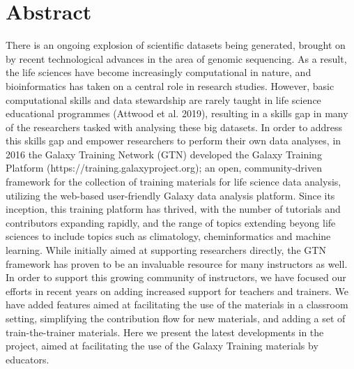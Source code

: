 \documentclass[10pt,letterpaper]{article}
\begin{document}
\section*{Abstract}
There is an ongoing explosion of scientific datasets being generated, brought on by recent technological advances in the area of genomic sequencing.
As a result, the life sciences have become increasingly computational in nature, and bioinformatics has taken on a central role in research studies.
However, basic computational skills and data stewardship are rarely taught in life science educational programmes (Attwood et al. 2019), resulting in a skills gap in many of the researchers tasked with analysing these big datasets.
In order to address this skills gap and empower researchers to perform their own data analyses, in 2016 the Galaxy Training Network (GTN) developed the Galaxy Training Platform (https://training.galaxyproject.org); an open, community-driven framework for the collection of training materials for life science data analysis, utilizing the web-based user-friendly Galaxy data analysis platform.
Since its inception, this training platform has thrived, with the number of tutorials and contributors expanding rapidly, and the range of topics extending beyong life sciences to include topics such as climatology, cheminformatics and machine learning.
While initially aimed at supporting researchers directly, the GTN framework has proven to be an invaluable resource for many instructors as well. In order to support this growing community of instructors, we have focused our efforts in recent years on adding increased support for teachers and trainers.
We have added features aimed at facilitating the use of the materials in a classroom setting, simplifying the contribution flow for new materials, and adding a set of train-the-trainer materials.
Here we present the latest developments in the project, aimed at facilitating the use of the Galaxy Training materials by educators.


\end{document}
